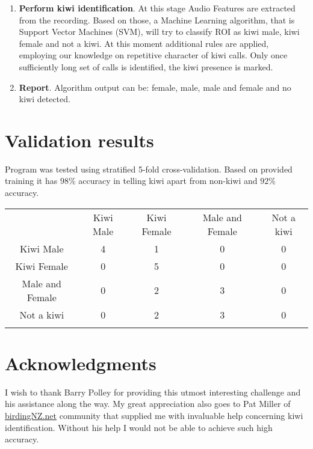 \documentclass[paper=a4, fontsize=11pt]{scrartcl}	%
\numberwithin{equation}{section}		%
\numberwithin{figure}{section}			%
\numberwithin{table}{section}				%
\begin{document}
\begin{enumerate}
	\item \textbf{Perform kiwi identification}. At this stage Audio Features are extracted from the recording. Based on those, a Machine Learning algorithm, that is Support Vector Machines (SVM), will try to classify ROI as kiwi male, kiwi female and not a kiwi. At this moment additional rules are applied, employing our knowledge on repetitive character of kiwi calls. Only once sufficiently long set of calls is identified, the kiwi presence is marked. 
	\item \textbf{Report}. Algorithm output can be: female, male, male and female and no kiwi detected.
\end{enumerate}

\section{Validation results}
Program was tested using stratified 5-fold cross-validation. Based on provided training it has $98$\% accuracy in telling kiwi apart from non-kiwi and $92$\% accuracy.
\begin{table}[hp]
\begin{tabularx}{.7\textwidth}{c|c c c c |}
 & Kiwi Male & Kiwi Female & Male and Female & \multicolumn{1}{c}{Not a kiwi} \\
\hhline{-----}
Kiwi Male & 4 \cellcolor[gray]{.8}& 1 & 0 & 0 \\
Kiwi Female & 0 & 5 \cellcolor[gray]{.8}& 0 & 0 \\
Male and Female & 0 & 2 & 3 \cellcolor[gray]{.8} & 0 \\
Not a kiwi & 0 & 2 & 3 & 0 \cellcolor[gray]{.8} \\
\hhline{~----}
\end{tabularx}
\end{table}

\section{Acknowledgments}
I wish to thank Barry Polley for providing this utmost interesting challenge and his assistance along the way. My great appreciation also goes to Pat Miller of \url{birdingNZ.net} community that supplied me with invaluable help concerning kiwi identification. Without his help I would not be able to achieve such high accuracy.

\end{document}
